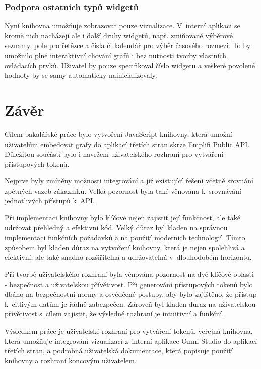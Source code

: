 \documentclass[czech, bc, kiv, he, iso690numb]{fasthesis}
\begin{document}
\subsection{Podpora ostatních typů widgetů}
Nyní knihovna umožňuje zobrazovat pouze vizualizace. V~interní aplikaci se kromě nich nacházejí ale i další druhy widgetů, např. zmiňované výběrové seznamy,
pole pro řetězce a čísla či kalendář pro výběr časového rozmezí. To by umožnilo plně interaktivní chování grafů i bez nutnosti tvorby vlastních ovládacích prvků.
Uživatel by pouze specifikoval číslo widgetu a veškeré povolené hodnoty by se samy automaticky nainicializovaly.


%
%
%
%
\chapter{Závěr}
Cílem bakalářské práce bylo vytvoření JavaScript knihovny, která umožní uživatelům embedovat grafy do aplikací třetích stran skrze
Emplifi Public API. Důležitou součástí bylo i navržení uživatelského rozhraní pro vytváření přístupových tokenů.

Nejprve byly zmíněny možnosti integrování a již existující řešení včetně srovnání zpětných vazeb zákazníků. Velká pozornost byla také
věnována k~srovnávání jednotlivých přístupů k~API.

Při implementaci knihovny bylo klíčové nejen zajistit její funkčnost, ale také udržovat přehledný a efektivní kód.
Velký důraz byl kladen na správnou implementaci funkčních požadavků a na použití moderních technologií. 
Tímto způsobem byl kladen důraz na vytvoření knihovny, která je nejen spolehlivá a efektivní, ale také snadno rozšiřitelná a udržovatelná v~dlouhodobém horizontu.

Při tvorbě uživatelského rozhraní byla věnována pozornost na dvě klíčové oblasti - bezpečnost a uživatelskou přívětivost. Při generování přístupových tokenů bylo dbáno na
bezpečnostní normy a osvědčené postupy, aby bylo zajištěno, že přístup k~citlivým datům je řádně zabezpečen. 
Zároveň byl kladen důraz na uživatelskou přívětivost s~cílem zajistit, že výsledné rozhraní je intuitivní a funkční.

Výsledkem práce je uživatelské rozhraní pro vytváření tokenů, veřejná knihovna, která umožňuje integrování vizualizací z~interní aplikace Omni Studio
do aplikací třetích stran, a podrobná uživatelská dokumentace, která popisuje použití knihovny a rozhraní koncovým uživatelem.
\end{document}
